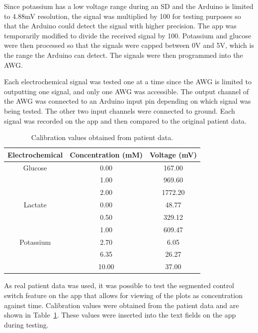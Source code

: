 Since potassium has a low voltage range during an SD and the Arduino is limited to 4.88mV resolution, the signal was multiplied by 100 for testing purposes so that the Arduino could detect the signal with higher precision. The app was temporarily modified to divide the received signal by 100. Potassium and glucose were then processed so that the signals were capped between 0V and 5V, which is the range the Arduino can detect. The signals were then programmed into the AWG. 

Each electrochemical signal was tested one at a time since the AWG is limited to outputting one signal, and only one AWG was accessible. The output channel of the AWG was connected to an Arduino input pin depending on which signal was being tested. The other two input channels were connected to ground. Each signal was recorded on the app and then compared to the original patient data.

\begin{table}[h!]
\centering
\begin{tabular}{||c c c||} 
 \hline
 Electrochemical & Concentration (mM) & Voltage (mV) \\ [0.5ex]
 \hline\hline
 Glucose & 0.00 & 167.00 \\
  & 1.00 & 969.60 \\
  & 2.00 & 1772.20 \\
 Lactate & 0.00 & 48.77 \\
  & 0.50 & 329.12 \\
  & 1.00 & 609.47 \\
 Potassium & 2.70 & 6.05 \\
  & 6.35 & 26.27 \\
  & 10.00 & 37.00 \\
 \hline
\end{tabular}
\caption{Calibration values obtained from patient data.}
\label{table: test2 calibration}
\end{table}


As real patient data was used, it was possible to test the segmented control switch feature on the app that allows for viewing of the plots as concentration against time. Calibration values were obtained from the patient data \cite{Rogers2017} and are shown in Table~\ref{table: test2 calibration}. These values were inserted into the text fields on the app during testing.

